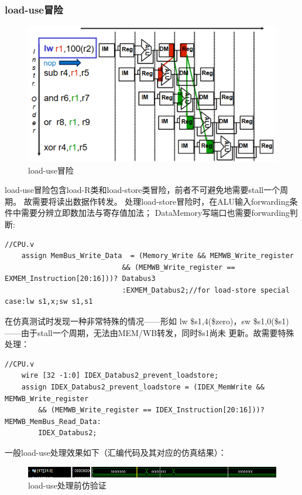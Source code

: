 \documentclass[10pt]{article}
\begin{document}
\subsubsection{load-use冒险}
\begin{figure}[H]
    \centering
    \includegraphics[scale=0.6]{load.png}
    \caption{load-use冒险}
    \end{figure}
load-use冒险包含load-R类和load-store类冒险，前者不可避免地需要stall一个周期。
故需要将读出数据作转发。
处理load-store冒险时，在ALU输入forwarding条件中需要分辨立即数加法与寄存值加法；
DataMemory写端口也需要forwarding判断:
\begin{lstlisting}[style={verilog-style}]
    //CPU.v
    assign MemBus_Write_Data  = (Memory_Write && MEMWB_Write_register 
	                        && (MEMWB_Write_register == EXMEM_Instruction[20:16]))? Databus3
	                        :EXMEM_Databus2;//for load-store special case:lw s1,x;sw s1,s1
\end{lstlisting}
在仿真测试时发现一种非常特殊的情况——形如
lw \$s1,4(\$zero)，sw \$s1,0(\$s1)——由于stall一个周期，无法由MEM/WB转发，同时\$s1尚未
更新。故需要特殊处理：
\begin{lstlisting}[style={verilog-style}]
    //CPU.v
    wire [32 -1:0] IDEX_Databus2_prevent_loadstore;
    assign IDEX_Databus2_prevent_loadstore = (IDEX_MemWrite && MEMWB_Write_register
        && (MEMWB_Write_register == IDEX_Instruction[20:16]))? MEMWB_MemBus_Read_Data:
        IDEX_Databus2;
\end{lstlisting}
一般load-use处理效果如下（汇编代码及其对应的仿真结果）：
\begin{figure}[H]
    \centering
    \includegraphics[scale=0.6]{add.png}
    \caption{load-use处理前仿验证}
    \end{figure}
\end{document}
